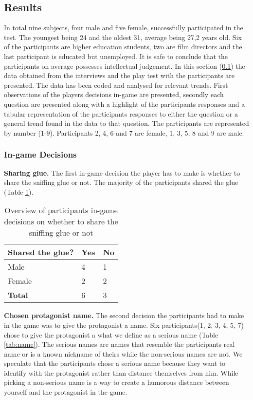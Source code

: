 \subsection{Results} \label{Results}
In total nine subjects, four male and five female, successfully participated in the test. The youngest being 24 and the oldest 31, average being 27,2 years old. Six of the participants are higher education students, two are film directors and the last participant is educated but unemployed. It is safe to conclude that the participants on average possesses intellectual judgement. In this section (\ref{Results}) the data obtained from the interviews and the play test with the participants are presented. The data has been coded and analysed for relevant trends. First observations of the players decisions in-game are presented, secondly each question are presented along with a highlight of the participants responses and a tabular representation of the participants responses to either the question or a general trend found in the data to that question. The participants are represented by number (1-9). Participants 2, 4, 6 and 7 are female, 1, 3, 5, 8 and 9 are male. 

\subsubsection{In-game Decisions}

\textbf{Sharing glue.} The first in-game decision the player has to make is whether to share the sniffing glue or not. The majority of the participants shared the glue (Table \ref{tab:glue}).

\begin{table}[h]
\centering
\begin{tabular}{l l l}
\hline
\textbf{Shared the glue?} & Yes & No \\
\hline
Male & 4 & 1 \\
Female & 2 & 2 \\
\textbf{Total} & 6 & 3 \\
\hline
\end{tabular}
\caption{\label{tab:glue}Overview of participants in-game decisions on whether to share the sniffing glue or not}
\end{table}


\textbf{Chosen protagonist name.} The second decision the participants had to make in the game was to give the protagonist a name. Six participants(1, 2, 3, 4, 5, 7) chose to give the protagonist a what we define as a serious name (Table \ref{tab:name}). The serious names are names that resemble the participants real name or is a known nickname of theirs while the non-serious names are not. We speculate that the participants chose a serious name because they want to identify with the protagonist rather than distance themselves from him. While picking a non-serious name is a way to create a humorous distance between yourself and the protagonist in the game.


